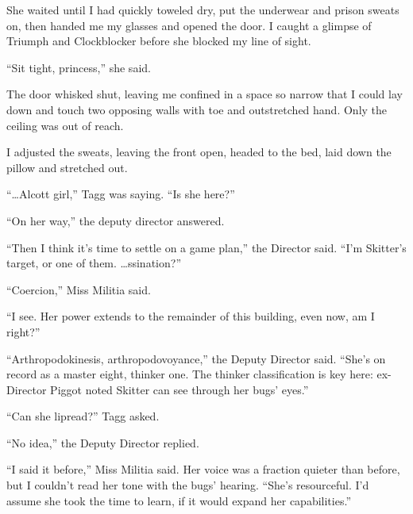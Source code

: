 She waited until I had quickly toweled dry, put the underwear and prison sweats on, then handed me my glasses and opened the door.  I caught a glimpse of Triumph and Clockblocker before she blocked my line of sight.



``Sit tight, princess,'' she said.



The door whisked shut, leaving me confined in a space so narrow that I could lay down and touch two opposing walls with toe and outstretched hand.  Only the ceiling was out of reach.



I adjusted the sweats, leaving the front open, headed to the bed, laid down the pillow and stretched out.



``\ldots{}Alcott girl,'' Tagg was saying.  ``Is she here?''



``On her way,'' the deputy director answered.



``Then I think it's time to settle on a game plan,'' the Director said.  ``I'm Skitter's target, or one of them.  \ldots{}ssination?''



``Coercion,'' Miss Militia said.



``I see.  Her power extends to the remainder of this building, even now, am I right?''



``Arthropodokinesis, arthropodovoyance,'' the Deputy Director said.  ``She's on record as a master eight, thinker one.  The thinker classification is key here: ex-Director Piggot noted Skitter can see through her bugs' eyes.''



``Can she lipread?'' Tagg asked.



``No idea,'' the Deputy Director replied.



``I said it before,'' Miss Militia said.  Her voice was a fraction quieter than before, but I couldn't read her tone with the bugs' hearing.  ``She's resourceful.  I'd assume she took the time to learn, if it would expand her capabilities.''



